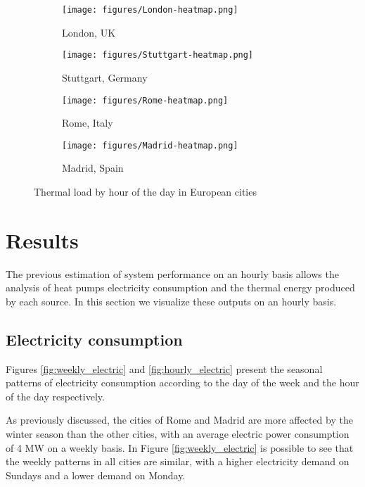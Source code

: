 \documentclass{article}
\begin{document}
\begin{figure}[h]

\begin{subfigure}{0.5\textwidth}
\texttt{[image: figures/London-heatmap.png]}
\caption{London, UK}
\label{fig:London_heatmap}
\end{subfigure}
\begin{subfigure}{0.5\textwidth}
\texttt{[image: figures/Stuttgart-heatmap.png]}
\caption{Stuttgart, Germany}
\label{fig:Stuttgart_heatmap}
\end{subfigure}

\begin{subfigure}{0.5\textwidth}
\texttt{[image: figures/Rome-heatmap.png]}
\caption{Rome, Italy}
\label{fig:Rome_heatmap}
\end{subfigure}
\begin{subfigure}{0.5\textwidth}
\texttt{[image: figures/Madrid-heatmap.png]}
\caption{Madrid, Spain}
\label{fig:Madrid_heatmap}
\end{subfigure}

\caption{Thermal load by hour of the day in European cities}
\label{fig:Europe_heatmap}
\end{figure}

\clearpage
\section{Results}
\label{sec:results}

The previous estimation of system performance on an hourly basis allows the analysis of heat pumps electricity consumption and the thermal energy produced by each source. In this section we visualize these outputs on an hourly basis.

\subsection{Electricity consumption}

Figures \ref{fig:weekly_electric} and \ref{fig:hourly_electric} present the seasonal patterns of electricity consumption according to the day of the week and the hour of the day respectively. 

As previously discussed, the cities of Rome and Madrid are more affected by the winter season than the other cities, with an average electric power consumption of 4 MW on a weekly basis. In Figure \ref{fig:weekly_electric} is possible to see that the weekly patterns in all cities are similar, with a higher electricity demand on Sundays and a lower demand on Monday.
\end{document}
